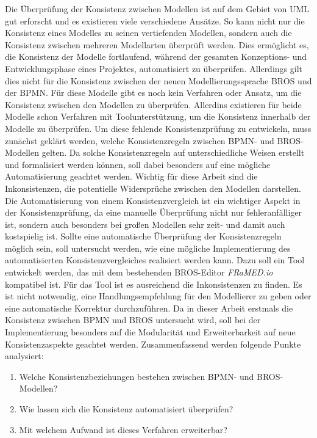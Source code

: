 Die Überprüfung der Konsistenz zwischen Modellen ist auf dem Gebiet von UML gut erforscht und es existieren viele verschiedene Ansätze.
So kann nicht nur die Konsistenz eines Modelles zu seinen vertiefenden Modellen, sondern auch die Konsistenz zwischen mehreren Modellarten überprüft werden.
Dies ermöglicht es, die Konsistenz der Modelle fortlaufend, während der gesamten Konzeptions- und Entwicklungsphase eines Projektes, automatisiert zu überprüfen. 
Allerdings gilt dies nicht für die Konsistenz zwischen der neuen Modellierungssprache BROS und der BPMN.
Für diese Modelle gibt es noch kein Verfahren oder Ansatz, um die Konsistenz zwischen den Modellen zu überprüfen.
Allerdins existieren für beide Modelle schon Verfahren mit Toolunterstützung, um die Konsistenz innerhalb der Modelle zu überprüfen.
Um diese fehlende Konsistenzprüfung zu entwickeln, muss zunächst geklärt werden, welche Konsistenzregeln zwischen BPMN- und BROS-Modellen gelten.
Da solche Konsistenzregeln auf unterschiedliche Weisen erstellt und formalisiert werden können, soll dabei besonders auf eine mögliche Automatisierung geachtet werden.
Wichtig für diese Arbeit sind die Inkonsistenzen, die potentielle Widersprüche zwischen den Modellen darstellen. 
Die Automatisierung von einem Konsistenzvergleich ist ein wichtiger Aspekt in der Konsistenzprüfung, da eine manuelle Überprüfung nicht nur fehleranfälliger ist, sondern auch besonders bei großen Modellen sehr zeit- und damit auch kostspielig ist.
Sollte eine automatische Überprüfung der Konsistenzregeln möglich sein, soll untersucht werden, wie eine mögliche Implementierung des automatisierten Konsistenzvergleiches realisiert werden kann.
Dazu soll ein Tool entwickelt werden, das mit dem bestehenden BROS-Editor \emph{FRaMED.io} kompatibel ist.
Für das Tool ist es ausreichend die Inkonsistenzen zu finden.
Es ist nicht notwendig, eine Handlungsempfehlung für den Modellierer zu geben oder eine automatische Korrektur durchzuführen. 
Da in dieser Arbeit erstmals die Konsistenz zwischen BPMN und BROS untersucht wird, soll bei der Implementierung besonders auf die Modularität und Erweiterbarkeit auf neue Konsistenzaspekte geachtet werden.
Zusammenfassend werden folgende Punkte analysiert:

\begin{enumerate}
    \item Welche Konsistenzbeziehungen bestehen zwischen BPMN- und BROS-Modellen?
    \item Wie lassen sich die Konsistenz automatisiert überprüfen?
    \item Mit welchem Aufwand ist dieses Verfahren erweiterbar?
\end{enumerate}

